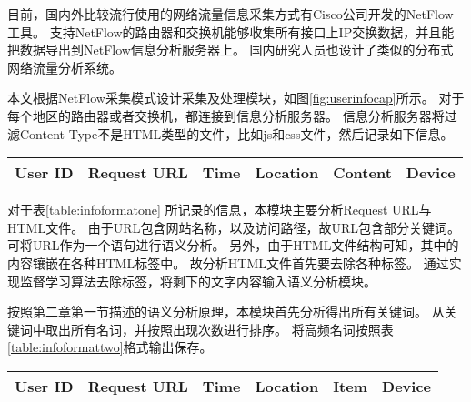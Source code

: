 \begin{center}
\label{fig:userinfocap}
\end{center}

目前，国内外比较流行使用的网络流量信息采集方式有Cisco公司开发的NetFlow工具。
支持NetFlow的路由器和交换机能够收集所有接口上IP交换数据，并且能把数据导出到NetFlow信息分析服务器上。
国内研究人员也设计了类似的分布式网络流量分析系统\parencite{乔媛媛2014基于,延皓2011基于流量监测的网络用户行为分析,董超2013基于网络流量监测的移动互联网特征研究}。

本文根据NetFlow采集模式设计采集及处理模块，如图\ref{fig:userinfocap}所示。
对于每个地区的路由器或者交换机，都连接到信息分析服务器。
信息分析服务器将过滤Content-Type不是HTML类型的文件，比如js和css文件，然后记录如下信息。
\begin{center}
\label{table:infoformatone}
\begin{tabular}{c|c|c|c|c|c}
	\hline
	User ID & Request URL & Time & Location & Content & Device \\
	\hline
\end{tabular}
\end{center}

对于表\ref{table:infoformatone}
所记录的信息，本模块主要分析Request URL与HTML文件。
由于URL包含网站名称，以及访问路径，故URL包含部分关键词。
可将URL作为一个语句进行语义分析。
另外，由于HTML文件结构可知，其中的内容镶嵌在各种HTML标签中。
故分析HTML文件首先要去除各种标签。
通过实现监督学习算法\parencite{Kohlsch2010Boilerplate}去除标签，将剩下的文字内容输入语义分析模块。

按照第二章第一节描述的语义分析原理，本模块首先分析得出所有关键词。
从关键词中取出所有名词，并按照出现次数进行排序。
将高频名词按照表\ref{table:infoformattwo}格式输出保存。
\begin{center}
\label{table:infoformattwo}
\begin{tabular}{c|c|c|c|c|c}
	\hline
	User ID & Request URL & Time & Location & Item & Device \\
	\hline
\end{tabular}
\end{center}
